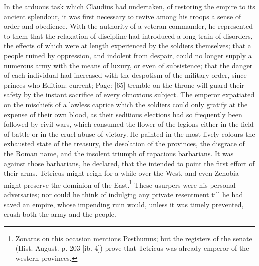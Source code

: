 In the arduous task which Claudius had undertaken, of restoring the empire to its ancient splendour, it was first necessary to revive among his troops a sense of order and obedience. With the authority of a veteran commander, he represented to them that the relaxation of discipline had introduced a long train of disorders, the effects of which were at length experienced by the soldiers themselves; that a people ruined by oppression, and indolent from despair, could no longer supply a numerous army with the means of luxury, or even of subsistence; that the danger of each individual had increased with the despotism of the military order, since princes who Edition: current; Page: [65] tremble on the throne will guard their safety by the instant sacrifice of every obnoxious subject. The emperor expatiated on the mischiefs of a lawless caprice which the soldiers could only gratify at the expense of their own blood, as their seditious elections had so frequently been followed by civil wars, which consumed the flower of the legions either in the field of battle or in the cruel abuse of victory. He painted in the most lively colours the exhausted state of the treasury, the desolation of the provinces, the disgrace of the Roman name, and the insolent triumph of rapacious barbarians. It was against those barbarians, he declared, that the intended to point the first effort of their arms. Tetricus might reign for a while over the West, and even Zenobia might preserve the dominion of the East.\footnote{Zonaras on this occasion mentions Posthumus; but the registers of the senate (Hist. August. p. 203 [ib. 4]) prove that Tetricus was already emperor of the western provinces.} These usurpers were his personal adversaries; nor could he think of indulging any private resentment till he had saved an empire, whose impending ruin would, unless it was timely prevented, crush both the army and the people.

